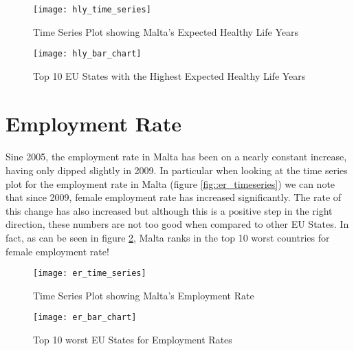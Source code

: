 \begin{figure}[!t]
	\begin{minipage}[b]{0.45\linewidth}
		\centering
		\texttt{[image: hly\_time\_series]}
		\caption[Healthy Life Years in Malta]{Time Series Plot showing Malta's Expected Healthy Life Years}
		\label{fig::hly_timeseries}
	\end{minipage}	
	\hspace{0.5cm}
	\begin{minipage}[b]{0.45\linewidth}
		\centering
		\texttt{[image: hly\_bar\_chart]}
		\caption[Top Healthy Life Years in the EU]{Top 10 EU States with the Highest Expected Healthy Life Years}
		\label{fig::hly_bar}
	\end{minipage}	
\end{figure}  

\section{Employment Rate}
\paragraph{ }Sine 2005, the employment rate in Malta has been on a nearly constant increase, having only dipped slightly in 2009. In particular when looking at the time series plot for the employment rate in Malta (figure \ref{fig::er_timeseries}) we can note that since 2009, female employment rate has increased significantly. The rate of this change has also increased but although this is a positive step in the right direction, these numbers are not too good when compared to other EU States. In fact, as can be seen in figure \ref{fig::er_bar}, Malta ranks in the top 10 worst countries for female employment rate!

 \begin{figure}[!b]
 	\begin{minipage}[b]{0.45\linewidth}
 		\centering
 		\texttt{[image: er\_time\_series]}
 		\caption[Employment Rate in Malta]{Time Series Plot showing Malta's Employment Rate}
 		\label{fig::er_timeseries}
 	\end{minipage}	
 	\hspace{0.5cm}
 	\begin{minipage}[b]{0.45\linewidth}
 		\centering
 		\texttt{[image: er\_bar\_chart]}
 		\caption[Worst Employment Rate Values in the EU]{Top 10 worst EU States for Employment Rates}
 		\label{fig::er_bar}
 	\end{minipage}	
 \end{figure}  


